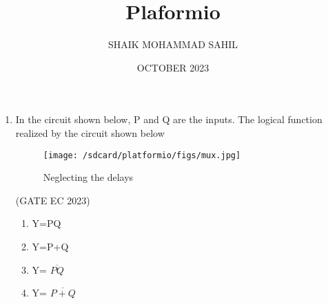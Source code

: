 \documentclass{article}
\title{Plaformio}
\author{SHAIK MOHAMMAD SAHIL}
\date{OCTOBER 2023}
\begin{document}
\maketitle

\begin{enumerate}
\item In the circuit shown below, P and Q are the inputs. The logical function realized by the circuit shown below

\begin{figure}[h]
\centering
\texttt{[image: /sdcard/platformio/figs/mux.jpg]}
\caption{Neglecting the delays}
\label{fig:mux.jpg}
\end{figure}

\hfill(GATE EC 2023)

\begin{enumerate}
    \item Y=PQ
    \item Y=P+Q    
    \item Y= $\overline{PQ}$
    \item Y= $\overline{P+Q}$
\end{enumerate}

\end{enumerate}
\end{document}
